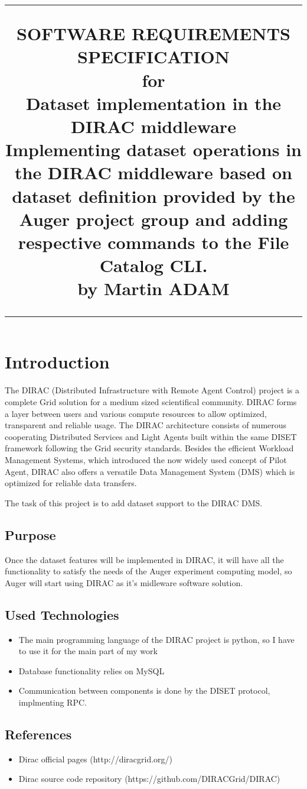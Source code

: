 \documentclass{scrreprt}
\title{%
\flushright
\rule{16cm}{5pt}\vskip1cm
\Huge{SOFTWARE REQUIREMENTS\\ SPECIFICATION}\\
\vspace{2cm}
for\\
\vspace{1cm}
Dataset implementation in the DIRAC middleware\\
\vspace{1cm}
\vspace{2cm}
\LARGE{Implementing dataset operations in the DIRAC middleware based on dataset definition provided by the Auger project group and adding respective commands to the File Catalog CLI.\\}
\vspace{2cm}
by Martin ADAM\\
\vfill
\rule{16cm}{5pt}
}
\date{}
\begin{document}
\maketitle
\tableofcontents
\chapter{Introduction}
The DIRAC (Distributed Infrastructure with Remote Agent Control) project is a complete Grid solution for a medium sized scientifical community. DIRAC forms a layer between users and various compute resources to allow optimized, transparent and reliable usage. The DIRAC architecture consists of numerous cooperating Distributed Services and Light Agents built within the same DISET framework following the Grid security standards. Besides the efficient Workload Management Systems, which introduced the now widely used concept of Pilot Agent, DIRAC also offers a versatile Data Management System (DMS) which is optimized for reliable data transfers. 

The task of this project is to add dataset support to the DIRAC DMS.
\section{Purpose}
Once the dataset features will be implemented in DIRAC, it will have all the functionality to satisfy the needs of the Auger experiment computing model, so Auger will start using DIRAC as it's midleware software solution.
\section{Used Technologies}

\begin{itemize}
\item The main programming language of the DIRAC project is python, so I have to use it for the main part of my work
\item Database functionality relies on MySQL
\item Communication between components is done by the DISET protocol, implmenting RPC.
\end{itemize}
\section{References}
\begin{itemize}
\item Dirac official pages (http://diracgrid.org/)
\item Dirac source code repository (https://github.com/DIRACGrid/DIRAC)
\end{itemize}
\end{document}

